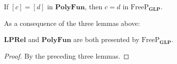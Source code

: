 \begin{lemma}[Completeness]\label{lem:completeness}
	If $[c] = [d]$ in $\mathbf{PolyFun}$, then $c = d$ in
	$\mathrm{FreeP}_{\mathbf{GLP}}$.
\end{lemma}

As a consequence of the three lemmas above:

\begin{theorem}\label{thm:main}
	$\mathbf{LPRel}$ and $\mathbf{PolyFun}$ are both presented by $\mathrm{FreeP}_{\mathbf{GLP}}$.
\end{theorem}
\begin{proof}
	By the preceding three lemmas.
\end{proof}
